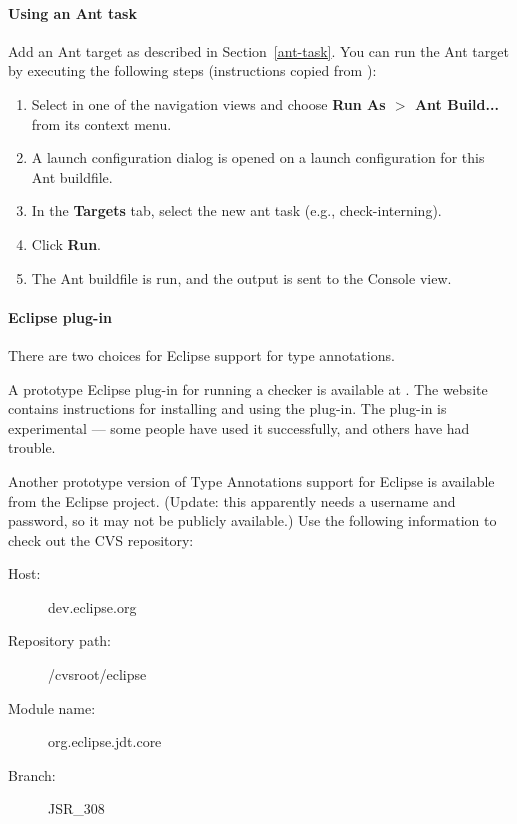 \paragraph{Using an Ant task}

Add an Ant target as described in Section~\ref{ant-task}.  You can
run the Ant target by executing the following steps
(instructions copied from
):

\begin{enumerate}

\item
  Select  in one of the navigation views and choose
  {\bf Run As $>$ Ant Build...} from its context menu.

\item
  A launch configuration dialog is opened on a launch configuration
  for this Ant buildfile.

\item
  In the {\bf Targets} tab, select the new ant task (e.g., check-interning).

\item
  Click {\bf Run}.

\item
  The Ant buildfile is run, and the output is sent to the Console view.

\end{enumerate}

\paragraph{Eclipse plug-in}

There are two choices for Eclipse support for type annotations.

A prototype Eclipse plug-in for running a checker is available at
.
The website contains instructions for installing and using the plug-in.
The plug-in is
experimental --- some people have used it successfully, and others have had
trouble.

Another prototype version of Type Annotations support for Eclipse is
available from the Eclipse project.
(Update:  this apparently needs a username and password, so it may not be
publicly available.)
Use the following information to check
out the CVS repository:
\begin{description}
\item[Host:]                 dev.eclipse.org
\item[Repository path:] /cvsroot/eclipse
\item[Module name:]    org.eclipse.jdt.core
\item[Branch:]             JSR\_308
\end{description}


